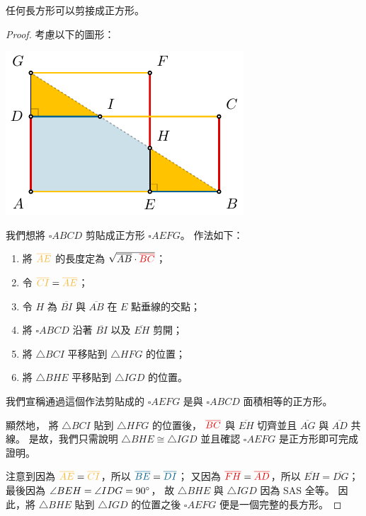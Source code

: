 \documentclass{article}
\begin{document}
\begin{multicols}{2}
\begin{theorem}\label{thm:rectangle-to-square}
	任何長方形可以剪接成正方形。
\end{theorem}
\begin{proof}
	考慮以下的圖形：
	\begin{center}
		\includegraphics[scale=1]{figures/figure-rectangle_to_square.pdf}
	\end{center}
	我們想將 $\square{ABCD}$ 剪貼成正方形 $\square{AEFG}$。
	作法如下：
	\begin{enumerate}
		\item 將 $\yellow{\overline{AE}}$ 的長度定為 $\sqrt{\overline{AB}\cdot\red{\overline{BC}}}$；
		\item 令 $\yellow{\overline{CI}}=\yellow{\overline{AE}}$；
		\item 令 $H$ 為 $\overline{BI}$ 與 $\overline{AB}$ 在 $E$ 點垂線的交點；
		\item 將 $\square{ABCD}$ 沿著 $\overline{BI}$ 以及 $\overline{EH}$ 剪開；
		\item 將 $\triangle{BCI}$ 平移貼到 $\triangle{HFG}$ 的位置；%
		\item 將 $\triangle{BHE}$ 平移貼到 $\triangle{IGD}$ 的位置。
	\end{enumerate}
	我們宣稱通過這個作法剪貼成的 $\square{AEFG}$ 是與 $\square{ABCD}$ 面積相等的正方形。

	顯然地，
	將 $\triangle{BCI}$ 貼到 $\triangle{HFG}$ 的位置後，
	$\red{\overline{BC}}$ 與 $\overline{EH}$ 切齊並且
	$\overline{AG}$ 與 $\overline{AD}$ 共線。
	是故，我們只需說明 $\triangle{BHE}\cong\triangle{IGD}$ 並且確認 $\square{AEFG}$ 是正方形即可完成證明。

	注意到因為 $\yellow{\overline{AE}}=\yellow{\overline{CI}}$，所以 $\blue{\overline{BE}}=\blue{\overline{DI}}$；
	又因為 $\red{\overline{FH}}=\red{\overline{AD}}$，所以 $\overline{EH}=\overline{DG}$；
	最後因為 $\angle{BEH}=\angle{IDG}=90^{\circ}$，
	故 $\triangle{BHE}$ 與 $\triangle{IGD}$ 因為 SAS 全等。
	因此，將 $\triangle{BHE}$ 貼到 $\triangle{IGD}$ 的位置之後 $\square{AEFG}$ 便是一個完整的長方形。


\end{proof}
\end{multicols}
\end{document}
